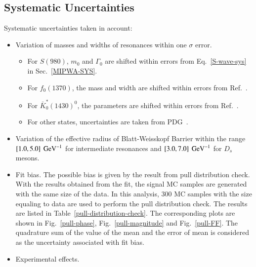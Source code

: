\subsection{Systematic Uncertainties}
\label{PWA-Sys}
\par{
    Systematic uncertainties taken in account:
    \begin{itemize}
        \item \uppercase\expandafter{} Variation of masses and widths of resonances within one $\sigma$ error.
            \begin{itemize}
                \item For $S(980)$, $m_{0}$ and $\Gamma_{0}$ are shifted within errors from Eq.~\ref{S-wave-sys} in Sec.~\ref{MIPWA-SYS}.
                \item For $f_{0}(1370)$, the mass and width are shifted within errors from Ref.~\cite{para-f01370}.
                \item For $\bar{K}^{*}_{0}(1430)^{0}$, the parameters are shifted within errors from Ref.~\cite{CLEO-Flatte}.
                \item For other states, uncertainties are taken from PDG~\cite{PDG2018}.
            \end{itemize}
        \item \uppercase\expandafter{} Variation of the effective radius of Blatt-Weisskopf Barrier within the range $\left[1.0, 5.0\right] \ {\rm GeV}^{-1}$ for intermediate resonances and  $\left[3.0, 7.0\right] \ {\rm GeV}^{-1}$ for $D_{s}$ mesons. 
        \item \uppercase\expandafter{} Fit bias. The possible bias is given by the result from pull distribution check. 
            With the results obtained from the fit, the signal MC samples are generated with the same size of the data. In this analysis, 300 MC samples with the size equaling to data are used to perform the pull distribution check.
            The results are listed in Table~\ref{pull-distribution-check}.
            The corresponding plots are shown in Fig.~\ref{pull-phase}, Fig.~\ref{pull-magnitude} and Fig.~\ref{pull-FF}.
            The quadrature sum of the value of the mean and the error of mean is considered as the uncertainty associated with fit bias.
        \item \uppercase\expandafter{} Experimental effects. 

\end{itemize}}
